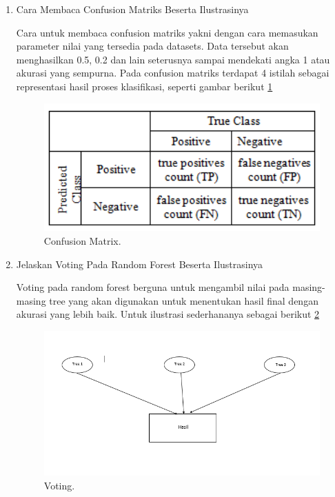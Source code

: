 \begin{enumerate}
\item Cara Membaca Confusion Matriks Beserta Ilustrasinya \par
Cara untuk membaca confusion matriks yakni dengan cara memasukan parameter nilai yang tersedia pada datasets. Data tersebut akan  menghasilkan 0.5, 0.2 dan lain seterusnya sampai mendekati angka 1 atau akurasi yang sempurna. Pada confusion matriks terdapat 4 istilah sebagai representasi hasil proses klasifikasi, seperti gambar berikut \ref{R2}
		\begin{figure}[ht]
		\centerline{\includegraphics[width=1\textwidth]{figures/im/R2.png}}
		\caption{Confusion Matrix.}
		\label{R2}
		\end{figure}

\item Jelaskan Voting Pada Random Forest Beserta Ilustrasinya \par
Voting pada random forest berguna untuk mengambil nilai pada masing-masing tree yang akan digunakan untuk menentukan hasil final dengan akurasi yang lebih baik. Untuk ilustrasi sederhananya sebagai berikut \ref{R3}
		\begin{figure}[ht]
		\centerline{\includegraphics[width=1\textwidth]{figures/im/R3.png}}
		\caption{Voting.}
		\label{R3}
		\end{figure}
\end{enumerate}



